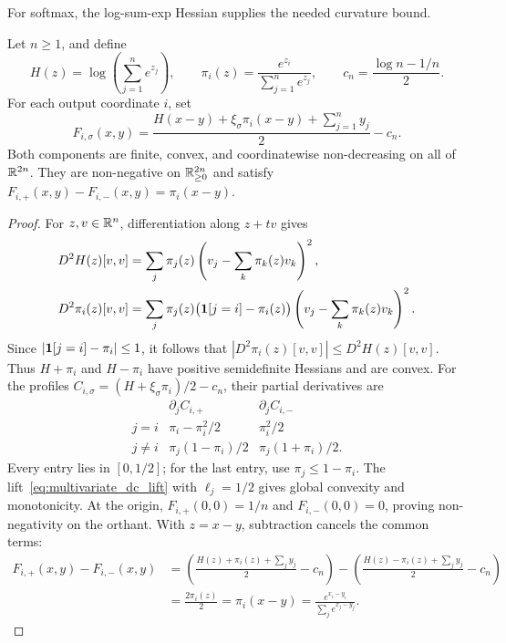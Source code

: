 For softmax, the log-sum-exp Hessian supplies the needed curvature bound.

\begin{theoremenv}\label{thm:softmax_dc_split}
Let $n\ge1$, and define
\begin{equation*}
    H(z)=\log\!\left(\sum_{j=1}^n e^{z_j}\right),
    \qquad \pi_i(z)=\frac{e^{z_i}}{\sum_{j=1}^n e^{z_j}},
    \qquad c_n=\frac{\log n-1/n}{2}.
\end{equation*}
For each output coordinate $i$, set
\begin{equation}
    F_{i,\sigma}(x,y)
    =\frac{H(x-y)+\xi_\sigma\pi_i(x-y)+\sum_{j=1}^n y_j}{2}-c_n.
    \label{eq:softmax_dc_pair}
\end{equation}
Both components are finite, convex, and coordinatewise non-decreasing on all of $\mathbb{R}^{2n}$. They are non-negative on $\mathbb{R}^{2n}_{\ge0}$ and satisfy
$F_{i,+}(x,y)-F_{i,-}(x,y)=\pi_i(x-y)$.
\end{theoremenv}

\begin{proof}
For $z,v\in\mathbb{R}^n$, differentiation along $z+tv$ gives
\begin{equation}
\begin{aligned}
    D^2H(z)[v,v]
    &=\sum_j\pi_j(z)\left(v_j-\sum_k\pi_k(z)v_k\right)^2,\\
    D^2\pi_i(z)[v,v]
    &=\sum_j\pi_j(z)\bigl(\mathbf{1}[j=i]-\pi_i(z)\bigr)
      \left(v_j-\sum_k\pi_k(z)v_k\right)^2.
\end{aligned}
    \label{eq:softmax_curvature_domination}
\end{equation}
Since $|\mathbf{1}[j=i]-\pi_i|\le1$, it follows that
$|D^2\pi_i(z)[v,v]|\le D^2H(z)[v,v]$. Thus $H+\pi_i$ and $H-\pi_i$ have positive semidefinite Hessians and are convex. For the profiles $C_{i,\sigma}=(H+\xi_\sigma\pi_i)/2-c_n$, their partial derivatives are
\begin{equation}
\begin{array}{c|cc}
 & \partial_j C_{i,+} & \partial_j C_{i,-}\\ \hline
 j=i & \pi_i-\pi_i^2/2 & \pi_i^2/2\\
 j\ne i & \pi_j(1-\pi_i)/2 & \pi_j(1+\pi_i)/2.
\end{array}
    \label{eq:softmax_profile_gradients}
\end{equation}
Every entry lies in $[0,1/2]$; for the last entry, use $\pi_j\le1-\pi_i$. The lift~\eqref{eq:multivariate_dc_lift} with $\ell_j=1/2$ gives global convexity and monotonicity. At the origin, $F_{i,+}(0,0)=1/n$ and $F_{i,-}(0,0)=0$, proving non-negativity on the orthant. With $z=x-y$, subtraction cancels the common terms:
\begin{align*}
F_{i,+}(x,y)-F_{i,-}(x,y)
&=\left(\frac{H(z)+\pi_i(z)+\sum_j y_j}{2}-c_n\right)
 -\left(\frac{H(z)-\pi_i(z)+\sum_j y_j}{2}-c_n\right)\\
&=\frac{2\pi_i(z)}{2}=\pi_i(x-y)
 =\frac{e^{x_i-y_i}}{\sum_j e^{x_j-y_j}}.
\end{align*}
\end{proof}

